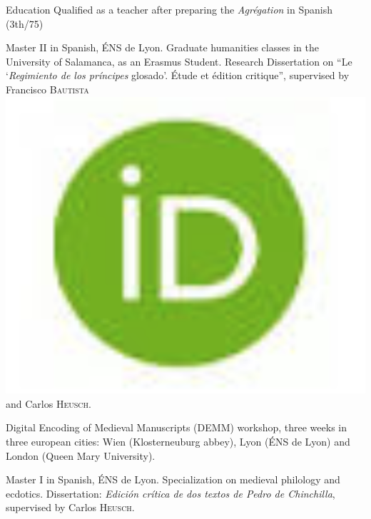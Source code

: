 \begin{rubric}{Education}
                                \entry*[2016-2017]
                            Qualified as a teacher after preparing the \textit{Agrégation} in
                        Spanish (3th/75)
                    
                                \entry*[2015-2016]
                            Master II in Spanish, ÉNS de Lyon. Graduate humanities classes in the
                        University of Salamanca, as an Erasmus Student. Research Dissertation on
                        \enquote{Le \enquote{\textit{Regimiento de los príncipes} glosado}.
                        Étude et édition critique}, supervised by Francisco \textsc{Bautista}\href{https://orcid.org/0000-0002-2676-0388}{\includegraphics[scale=0.025]{../img/orcid.png}} and
                        Carlos \textsc{Heusch}.
                    
                                \entry*
                            Digital Encoding of Medieval Manuscripts (DEMM) workshop, three weeks
                        in three european cities: Wien (Klosterneuburg abbey), Lyon (ÉNS de Lyon)
                        and London (Queen Mary University).
                    
                                \entry*[2014-2015]
                            Master I in Spanish, ÉNS de Lyon. Specialization on medieval philology
                        and ecdotics. Dissertation: \textit{Edición crítica de dos textos de Pedro de
                        Chinchilla}, supervised by Carlos
                        \textsc{Heusch}.
                    

\end{rubric}
